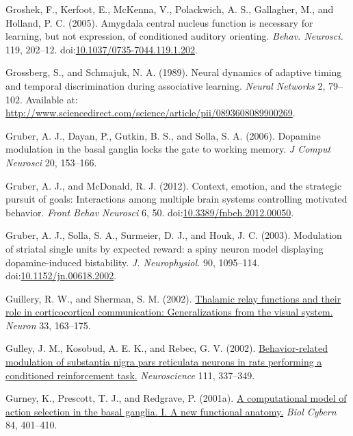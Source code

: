 \documentclass[
  11pt,
  a4paper,
]{scrbook}
\newlength{\cslhangindent}
\newenvironment{CSLReferences}[2] %
 {\begin{list}{}{%
  \setlength{\itemindent}{0pt}
  \setlength{\leftmargin}{0pt}
  \setlength{\parsep}{0pt}
  \ifodd #1
   \setlength{\leftmargin}{\cslhangindent}
   \setlength{\itemindent}{-1\cslhangindent}
  \fi
  \setlength{\itemsep}{#2\baselineskip}}}
 {\end{list}}
\begin{document}
\begin{CSLReferences}{1}{1}
Groshek, F., Kerfoot, E., McKenna, V., Polackwich, A. S., Gallagher, M.,
and Holland, P. C. (2005). {Amygdala central nucleus function is
necessary for learning, but not expression, of conditioned auditory
orienting.} \emph{Behav. Neurosci.} 119, 202--12.
doi:\href{https://doi.org/10.1037/0735-7044.119.1.202}{10.1037/0735-7044.119.1.202}.

Grossberg, S., and Schmajuk, N. A. (1989). {Neural dynamics of adaptive
timing and temporal discrimination during associative learning}.
\emph{Neural Networks} 2, 79--102. Available at:
\url{http://www.sciencedirect.com/science/article/pii/0893608089900269}.

Gruber, A. J., Dayan, P., Gutkin, B. S., and Solla, S. A. (2006).
Dopamine modulation in the basal ganglia locks the gate to working
memory. \emph{J Comput Neurosci} 20, 153--166.

Gruber, A. J., and McDonald, R. J. (2012). Context, emotion, and the
strategic pursuit of goals: Interactions among multiple brain systems
controlling motivated behavior. \emph{Front Behav Neurosci} 6, 50.
doi:\href{https://doi.org/10.3389/fnbeh.2012.00050}{10.3389/fnbeh.2012.00050}.

Gruber, A. J., Solla, S. A., Surmeier, D. J., and Houk, J. C. (2003).
{Modulation of striatal single units by expected reward: a spiny neuron
model displaying dopamine-induced bistability.} \emph{J. Neurophysiol.}
90, 1095--114.
doi:\href{https://doi.org/10.1152/jn.00618.2002}{10.1152/jn.00618.2002}.

Guillery, R. W., and Sherman, S. M. (2002).
\href{https://www.ncbi.nlm.nih.gov/pubmed/11804565}{Thalamic relay
functions and their role in corticocortical communication:
Generalizations from the visual system.} \emph{Neuron} 33, 163--175.

Gulley, J. M., Kosobud, A. E. K., and Rebec, G. V. (2002).
\href{https://www.ncbi.nlm.nih.gov/pubmed/11983319}{Behavior-related
modulation of substantia nigra pars reticulata neurons in rats
performing a conditioned reinforcement task.} \emph{Neuroscience} 111,
337--349.

Gurney, K., Prescott, T. J., and Redgrave, P. (2001a).
\href{https://www.ncbi.nlm.nih.gov/pubmed/11417052}{A computational
model of action selection in the basal ganglia.{ I. A }new functional
anatomy.} \emph{Biol Cybern} 84, 401--410.


\end{CSLReferences}
\end{document}
